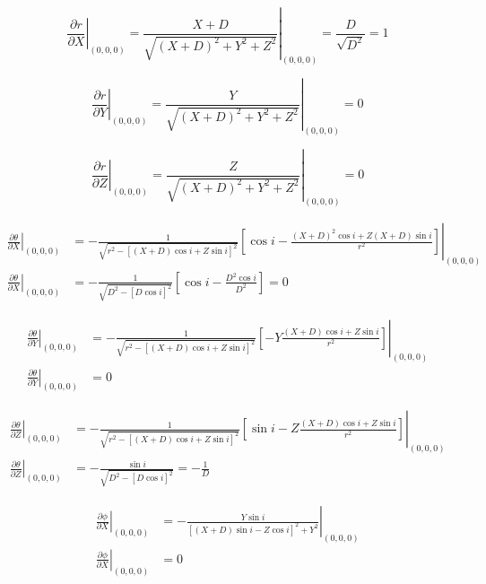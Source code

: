 \begin{equation}
\left. \frac{\partial r}{\partial X} \right|_{(0,0,0)}= \left.\frac{X+D}{\sqrt{(X+D)^2 + Y^2 + Z^2}}\right|_{(0,0,0)}
= \frac{D}{\sqrt{D^2}} = 1
\end{equation}

\begin{equation}
\left. \frac{\partial r}{\partial Y} \right|_{(0,0,0)}= \left.\frac{Y}{\sqrt{(X+D)^2 + Y^2 + Z^2}}\right|_{(0,0,0)} = 0
\end{equation}

\begin{equation}
\left. \frac{\partial r}{\partial Z} \right|_{(0,0,0)}= \left.\frac{Z}{\sqrt{(X+D)^2 + Y^2 + Z^2}}\right|_{(0,0,0)} = 0
\end{equation}

\footnotesize
\begin{align}
\left. \frac{\partial \theta}{\partial X} \right|_{(0,0,0)} &= \left.-\frac{1}{\sqrt{r^2-[(X+D)\cos i + Z \sin i]^2}}  \left[ \cos i - \frac{(X+D)^2 \cos i + Z(X+D) \sin i}{r^2}\right]\right|_{(0,0,0)} \nonumber \\
\left. \frac{\partial \theta}{\partial X} \right|_{(0,0,0)} &= -\frac{1}{\sqrt{D^2 -[D\cos i ]^2}}  \left[ \cos i - \frac{D^2 \cos i }{D^2}\right]=0
\end{align}
\normalsize

\footnotesize
\begin{align}
\left. \frac{\partial \theta}{\partial Y} \right|_{(0,0,0)} &= \left.-\frac{1}{\sqrt{r^2-[(X+D)\cos i + Z \sin i]^2}}  \left[ -Y \frac{(X+D) \cos i + Z \sin i}{r^2}\right]\right|_{(0,0,0)} \nonumber \\
\left. \frac{\partial \theta}{\partial Y} \right|_{(0,0,0)} &=0
\end{align}
\normalsize

\footnotesize
\begin{align}
\left. \frac{\partial \theta}{\partial Z} \right|_{(0,0,0)} &= \left.-\frac{1}{\sqrt{r^2-[(X+D)\cos i + Z \sin i]^2}}  \left[ \sin i -  Z \frac{(X+D) \cos i + Z \sin i}{r^2}\right]\right|_{(0,0,0)} \nonumber \\
\left. \frac{\partial \theta}{\partial Z} \right|_{(0,0,0)} &= -\frac{\sin i}{\sqrt{D^2 -[D\cos i ]^2}} = - \frac{1}{D}
\end{align}
\normalsize

\begin{align}
\left. \frac{\partial \phi}{\partial X} \right|_{(0,0,0)} &= \left.-\frac{Y \sin i}{[(X+D)\sin i - Z \cos i ]^2 + Y^2 } \right|_{(0,0,0)} \nonumber \\
\left. \frac{\partial \phi}{\partial X} \right|_{(0,0,0)} &= 0  
\end{align}

